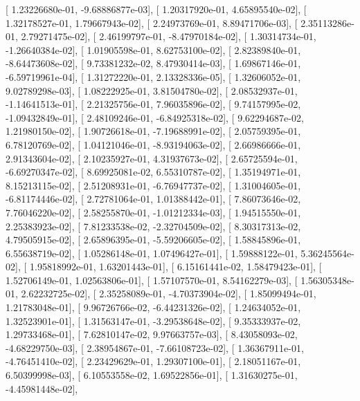 \documentclass{article}
\begin{document}
       [  1.23226680e-01,  -9.68886877e-03],
       [  1.20317920e-01,   4.65895540e-02],
       [  1.32178527e-01,   1.79667943e-02],
       [  2.24973769e-01,   8.89471706e-03],
       [  2.35113286e-01,   2.79271475e-02],
       [  2.46199797e-01,  -8.47970184e-02],
       [  1.30314734e-01,  -1.26640384e-02],
       [  1.01905598e-01,   8.62753100e-02],
       [  2.82389840e-01,  -8.64473608e-02],
       [  9.73381232e-02,   8.47930414e-03],
       [  1.69867146e-01,  -6.59719961e-04],
       [  1.31272220e-01,   2.13328336e-05],
       [  1.32606052e-01,   9.02789298e-03],
       [  1.08222925e-01,   3.81504780e-02],
       [  2.08532937e-01,  -1.14641513e-01],
       [  2.21325756e-01,   7.96035896e-02],
       [  9.74157995e-02,  -1.09432849e-01],
       [  2.48109246e-01,  -6.84925318e-02],
       [  9.62294687e-02,   1.21980150e-02],
       [  1.90726618e-01,  -7.19688991e-02],
       [  2.05759395e-01,   6.78120769e-02],
       [  1.04121046e-01,  -8.93194063e-02],
       [  2.66986666e-01,   2.91343604e-02],
       [  2.10235927e-01,   4.31937673e-02],
       [  2.65725594e-01,  -6.69270347e-02],
       [  8.69925081e-02,   6.55310787e-02],
       [  1.35194971e-01,   8.15213115e-02],
       [  2.51208931e-01,  -6.76947737e-02],
       [  1.31004605e-01,  -6.81174446e-02],
       [  2.72781064e-01,   1.01388442e-01],
       [  7.86073646e-02,   7.76046220e-02],
       [  2.58255870e-01,  -1.01212334e-03],
       [  1.94515550e-01,   2.25383923e-02],
       [  7.81233538e-02,  -2.32704509e-02],
       [  8.30317313e-02,   4.79505915e-02],
       [  2.65896395e-01,  -5.59206605e-02],
       [  1.58845896e-01,   6.55638719e-02],
       [  1.05286148e-01,   1.07496427e-01],
       [  1.59888122e-01,   5.36245564e-02],
       [  1.95818992e-01,   1.63201443e-01],
       [  6.15161441e-02,   1.58479423e-01],
       [  1.52706149e-01,   1.02563806e-01],
       [  1.57107570e-01,   8.54162279e-03],
       [  1.56305348e-01,   2.62232725e-02],
       [  2.35258089e-01,  -4.70373904e-02],
       [  1.85099494e-01,   1.21783048e-01],
       [  9.96726766e-02,  -6.44231326e-02],
       [  1.24634052e-01,   1.32523901e-01],
       [  1.31563147e-01,  -3.29538648e-02],
       [  9.35333937e-02,   1.29733468e-01],
       [  7.62810147e-02,   9.97663757e-03],
       [  8.43058093e-02,  -4.68229750e-03],
       [  2.38954867e-01,  -7.66108723e-02],
       [  1.36367911e-01,  -4.76451410e-02],
       [  2.23429629e-01,   1.29307100e-01],
       [  2.18051167e-01,   6.50399998e-03],
       [  6.10553558e-02,   1.69522856e-01],
       [  1.31630275e-01,  -4.45981448e-02],
\end{document}
